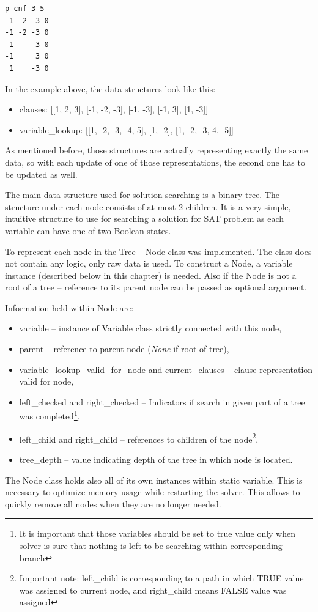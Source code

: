\documentclass[12pt,english,pdflatex]{aghdpl}
\begin{document}
\begin{lstlisting}
p cnf 3 5 
 1  2  3 0 
-1 -2 -3 0
-1    -3 0 
-1     3 0 
 1    -3 0
\end{lstlisting}
In the example above, the data structures look like this:
\begin{itemize}
\item clauses: {[}{[}1, 2, 3{]}, {[}-1, -2, -3{]}, {[}-1, -3{]}, {[}-1,
3{]}, {[}1, -3{]}{]}
\item variable\_lookup: {[}{[}1, -2, -3, -4, 5{]}, {[}1, -2{]}, {[}1, -2,
-3, 4, -5{]}{]}
\end{itemize}
As mentioned before, those structures are actually representing exactly the
same  data, so with each update of one of those representations, the second one has
to be updated as well.

The main data structure used for  solution searching is a binary tree.
The  structure under each node consists of at most 2 children. It is a very simple,  intuitive
structure to use for searching a solution for SAT problem as each
variable can have one of two Boolean states. 

To represent each node
in the Tree -- Node class was implemented. The class does not contain any
logic, only raw data is used. To construct a Node, a variable instance (described
below in this chapter) is needed. Also if the Node is not a root of
a tree -- reference to its parent node can be passed as optional argument.

Information held within Node are:
\begin{itemize}
\item variable -- instance of Variable class strictly connected with this
node,
\item parent -- reference to parent node (\textit{None} if root of tree),
\item variable\_lookup\_valid\_for\_node and current\_clauses -- clause representation
valid for node,
\item left\_checked and right\_checked -- Indicators if search in given part
of a tree was completed\footnote{It is important that those variables
should be set to true value only when solver is sure that nothing
is left to be searching within corresponding branch},
\item left\_child and right\_child -- references to children of the 
node\footnote{Important note: left\_child is corresponding to a path in which TRUE
value was assigned to current node, and right\_child means FALSE value
was assigned}, 
\item tree\_depth -- value indicating depth of the tree in which node is
located.
\end{itemize}
The Node class holds also all of its own instances within static variable.
This is necessary to optimize memory usage while restarting the solver.
This allows to quickly remove all nodes when they are no longer needed.
\end{document}
